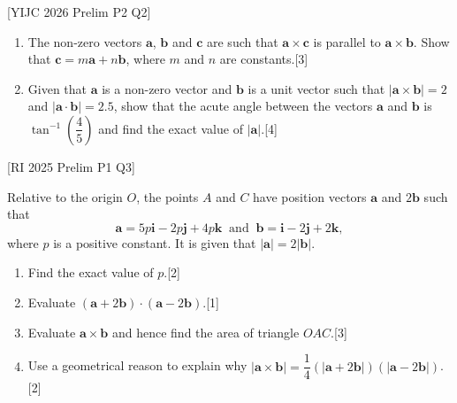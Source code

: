 \documentclass[a4paper,11pt,oneside]{book}
\newcounter{wq}[section]
\newcommand{\Q}[1]{\par\needspace{5\baselineskip}\medskip\stepcounter{wq}\noindent\textbf{\thewq}\quad #1\par}
\begin{document}
\Q{\textcolor{black!60}{\small[YIJC 2026 Prelim P2 Q2]}\par\smallskip \begin{enumerate}[label=\textbf{(\alph*)},leftmargin=2.2em,itemsep=3pt]\item The non-zero vectors $\mathbf a$, $\mathbf b$ and $\mathbf c$ are such that $\mathbf a\times\mathbf c$ is parallel to $\mathbf a\times\mathbf b$. Show that $\mathbf c=m\mathbf a+n\mathbf b$, where $m$ and $n$ are constants.\hfill[3]\item Given that $\mathbf a$ is a non-zero vector and $\mathbf b$ is a unit vector such that $|\mathbf a\times\mathbf b|=2$ and $|\mathbf a\cdot\mathbf b|=2.5$, show that the acute angle between the vectors $\mathbf a$ and $\mathbf b$ is $\tan^{-1}\left(\dfrac45\right)$ and find the exact value of $|\mathbf a|$.\hfill[4]\end{enumerate}}
\Q{\textcolor{black!60}{\small[RI 2025 Prelim P1 Q3]}\par\smallskip Relative to the origin $O$, the points $A$ and $C$ have position vectors $\mathbf a$ and $2\mathbf b$ such that \[\mathbf a=5p\mathbf i-2p\mathbf j+4p\mathbf k\ \text{ and }\ \mathbf b=\mathbf i-2\mathbf j+2\mathbf k,\] where $p$ is a positive constant. It is given that $|\mathbf a|=2|\mathbf b|$.\begin{enumerate}[label=\textbf{(\alph*)},leftmargin=2.2em,itemsep=3pt]\item Find the exact value of $p$.\hfill[2]\item Evaluate $(\mathbf a+2\mathbf b)\cdot(\mathbf a-2\mathbf b)$.\hfill[1]\item Evaluate $\mathbf a\times\mathbf b$ and hence find the area of triangle $OAC$.\hfill[3]\item Use a geometrical reason to explain why $|\mathbf a\times\mathbf b|=\dfrac14\left(|\mathbf a+2\mathbf b|\right)\left(|\mathbf a-2\mathbf b|\right)$.\hfill[2]\end{enumerate}}
\end{document}
